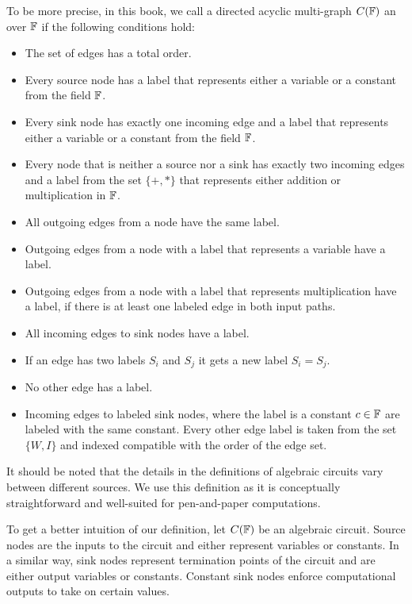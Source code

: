To be more precise, in this book, we call a directed acyclic multi-graph $C(\mathbb{F})$  an  over $\mathbb{F}$ if the following conditions hold:

\begin{itemize}
\label{def:algebraic-circuit}
\item The set of edges has a total order.  
\item Every source node has a label that represents either a variable or a constant from the field $\mathbb{F}$.
\item Every sink node has exactly one incoming edge and a label that represents either a variable or a constant from the field $\mathbb{F}$.
\item Every node that is neither a source nor a sink has exactly two incoming edges and a label from the set $\{+,*\}$ that represents either addition or multiplication in $\mathbb{F}$.
\item All outgoing edges from a node have the same label.
\item Outgoing edges from a node with a label that represents a variable have a label.
\item Outgoing edges from a node with a label that represents multiplication have a label, if there is at least one labeled edge in both input paths.
\item All incoming edges to sink nodes have a label.
\item If an edge has two labels $S_i$ and $S_j$ it gets a new label $S_i = S_j$.
\item No other edge has a label.
\item Incoming edges to labeled sink nodes, where the label is a constant $c\in\mathbb{F}$ are labeled with the same constant. Every other edge label is taken from the set $\{W,I\}$ and indexed compatible with the order of the edge set. 
\end{itemize} 

It should be noted that the details in the definitions of algebraic circuits vary between different sources. We use this definition as it is conceptually straightforward and well-suited for pen-and-paper computations.

To get a better intuition of our definition, let $C(\mathbb{F})$ be an algebraic circuit. Source nodes are the inputs to the circuit and either represent variables or constants. In a similar way, sink nodes represent termination points of the circuit and are either output variables or constants. Constant sink nodes enforce computational outputs to take on certain values.  

